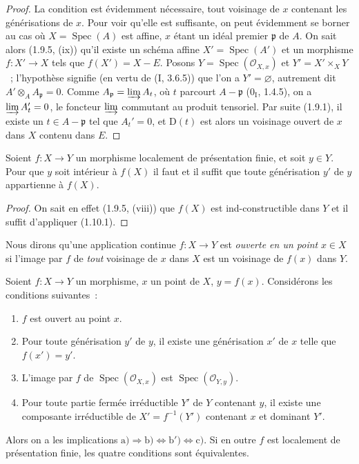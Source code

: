 \begin{proof}
La condition est évidemment nécessaire, tout voisinage de $x$ contenant les
générisations de $x$. Pour voir qu'elle est suffisante, on peut évidemment se
borner au cas où $X=\operatorname{Spec}(A)$ est affine, $x$ étant un idéal premier
$\mathfrak p$ de $A$. On sait alors (1.9.5, (ix)) qu'il existe un schéma affine
$X'=\operatorname{Spec}(A')$ et un morphisme $f:X'\to X$ tels que
$f(X')=X-E$. Posons $Y=\operatorname{Spec}(\mathcal O_{X,x})$ et
$Y'=X'\times_XY$~; l'hypothèse signifie (en
vertu de (I, 3.6.5)) que l'on a $Y'=\varnothing$, autrement dit
$A'\otimes_AA_{\mathfrak p}=0$. Comme
$A_{\mathfrak p}=\varinjlim A_t$, où $t$ parcourt $A-\mathfrak p$
($0_{\mathrm I}$, 1.4.5), on a $\varinjlim A_t'=0$, le foncteur
$\varinjlim$ commutant au produit tensoriel. Par suite (1.9.1), il existe un
$t\in A-\mathfrak p$ tel que $A_t'=0$, et $\mathrm D(t)$ est alors un
voisinage ouvert de $x$ dans $X$ contenu dans $E$.
\end{proof}

\begin{corollary}[1.10.2]
\label{IV.1.10.2-fr}
Soient $f:X\to Y$ un morphisme localement de présentation finie, et soit
$y\in Y$. Pour que $y$ soit intérieur à $f(X)$ il faut et il suffit que toute
générisation $y'$ de $y$ appartienne à $f(X)$.
\end{corollary}

\begin{proof}
On sait en effet (1.9.5, (viii)) que $f(X)$ est ind-constructible dans $Y$ et
il suffit d'appliquer (1.10.1).
\end{proof}

Nous dirons qu'une application continue $f:X\to Y$ est \emph{ouverte en un
point} $x\in X$ si l'image par $f$ de \emph{tout} voisinage de $x$ dans $X$
est un voisinage de $f(x)$ dans $Y$.

\begin{proposition}[1.10.3]
\label{IV.1.10.3-fr}
Soient $f:X\to Y$ un morphisme, $x$ un point de $X$, $y=f(x)$. Considérons
les conditions suivantes~:
\begin{enumerate}
  \item[a)] $f$ est ouvert au point $x$.
  \item[b)] Pour toute générisation $y'$ de $y$, il existe une générisation
  $x'$ de $x$ telle que $f(x')=y'$.
  \item[b')] L'image par $f$ de $\operatorname{Spec}(\mathcal O_{X,x})$ est
  $\operatorname{Spec}(\mathcal O_{Y,y})$.
  \item[c)] Pour toute partie fermée irréductible $Y'$ de $Y$ contenant $y$,
  il existe une composante irréductible de $X'=f^{-1}(Y')$ contenant $x$ et
  dominant $Y'$.
\end{enumerate}
Alors on a les implications
$\mathrm{a)}\Rightarrow\mathrm{b)}\Leftrightarrow\mathrm{b')}
\Leftrightarrow\mathrm{c)}$. Si en outre $f$ est localement de présentation
finie, les quatre conditions sont équivalentes.
\end{proposition}

